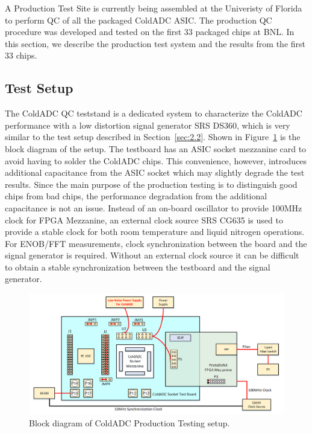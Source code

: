 \label{sec:6}


A Production Test Site is currently being assembled at the Univeristy of Florida to perform QC of all the packaged ColdADC ASIC.  The production QC procedure was developed and tested on the first 33 packaged chips at BNL. In this section, we describe the production test system and the results from the first 33 chips.

\subsection{Test Setup}
\label{sec:6.1}
The ColdADC QC teststand is a dedicated system to characterize the ColdADC performance with a low distortion 
signal generator SRS DS360, which is very similar to the test setup described in Section~\ref{sec:2.2}.  
Shown in Figure~\ref{fig:prodQC_blockdiagram} is the block diagram of the setup. The testboard has an ASIC 
socket mezzanine card to avoid having to solder the ColdADC chips. 
This convenience, however, introduces additional capacitance from the ASIC socket which may slightly degrade the test results.
Since the main purpose of the production testing is to distinguish good chips from bad chips, the performance degradation 
from the additional capacitance is not an issue. 
Instead of an on-board oscillator to provide 100MHz clock for FPGA Mezzanine, an external clock source SRS CG635 is used to provide a 
stable clock for both room temperature and liquid nitrogen operations. For ENOB/FFT measurements, clock synchronization between the 
board and the signal generator is required.  Without an external clock source it can be difficult to obtain a stable synchronization 
between the testboard and the signal generator. 
\begin{figure}[h!]
\centering
  \includegraphics[width=0.8\linewidth]{figures/prodQC_blockdiagram.png}
  \caption{Block diagram of ColdADC Production Testing setup.}
  \label{fig:prodQC_blockdiagram}
\end{figure}


